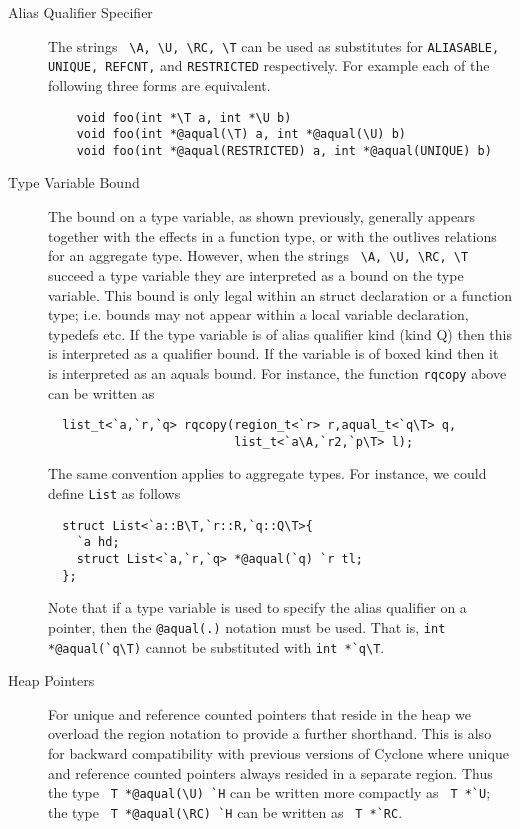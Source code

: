 \begin{description}
\item[Alias Qualifier Specifier] The strings \verb+ \A, \U, \RC, \T+
  can be used as substitutes for {\tt ALIASABLE, UNIQUE, REFCNT,} and
  {\tt RESTRICTED} respectively. For example each of the following
  three forms are equivalent.
  \begin{verbatim}
    void foo(int *\T a, int *\U b)
    void foo(int *@aqual(\T) a, int *@aqual(\U) b)
    void foo(int *@aqual(RESTRICTED) a, int *@aqual(UNIQUE) b)
  \end{verbatim} 
  
\item[Type Variable Bound] The bound on a type variable, as shown
  previously, generally appears together with the effects in a
  function type, or with the outlives relations for an aggregate
  type. However, when the strings \verb+ \A, \U, \RC, \T+ succeed a
  type variable they are interpreted as a bound on the type
  variable. This bound is only legal within an struct declaration or a
  function type; i.e. bounds may not appear within a local variable
  declaration, typedefs etc. If the type variable is of alias
  qualifier kind (kind Q) then this is interpreted as a qualifier
  bound. If the variable is of boxed kind then it is interpreted as an
  aquals bound. For instance, the function {\tt rqcopy} above can be
  written as
  
  \begin{verbatim}
  list_t<`a,`r,`q> rqcopy(region_t<`r> r,aqual_t<`q\T> q,
                          list_t<`a\A,`r2,`p\T> l);
  \end{verbatim}
  
  The same convention applies to aggregate types. For instance, we
  could define {\tt List} as follows

  \begin{verbatim}
  struct List<`a::B\T,`r::R,`q::Q\T>{ 
    `a hd; 
    struct List<`a,`r,`q> *@aqual(`q) `r tl;
  };
  \end{verbatim}

  Note that if a type variable is used to specify the alias qualifier
  on a pointer, then the \texttt{@aqual(.)} notation must be
  used. That is, \verb+int *@aqual(`q\T)+ cannot be substituted with
  \verb+int *`q\T+.

\item[Heap Pointers] For unique and reference counted pointers that
  reside in the heap we overload the region notation to provide a
  further shorthand. This is also for backward compatibility with
  previous versions of Cyclone where unique and reference counted
  pointers always resided in a separate region. Thus the type
  \verb+ T *@aqual(\U) `H+ can be written more compactly as
  \verb+ T *`U+; the type \verb+ T *@aqual(\RC) `H+ can be written as
  \verb+ T *`RC+.

\end{description}

